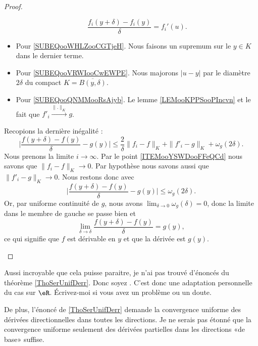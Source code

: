 \begin{proof}
\begin{subproof}
\begin{itemize}
			      \begin{equation}
				      \frac{ f_i(y+\delta)-f_i(y) }{ \delta }=f_i'(u).
			      \end{equation}
			\item Pour \ref{SUBEQooWHLZooCGTjeH}. Nous faisons un supremum sur le \( y\in K\) dans le dernier terme.
			\item Pour \ref{SUBEQooVRWIooCwEWPE}. Nous majorons \( | u-y |\) par le diamètre \( 2\delta\) du compact \( K=\overline{ B(y,\delta) }\).
			\item Pour \ref{SUBEQooQNMMooRsAjyb}. Le lemme \ref{LEMooKPPSooPIncvn} et le fait que \(   f'_i\stackrel{\| . \|_K}{\longrightarrow}g \).
		\end{itemize}

		Recopions la dernière inégalité :
		\begin{equation}
			\big| \frac{ f(y+\delta)-f(y) }{ \delta }-g(y) \big|\leq \frac{ 2 }{ \delta }\| f_i-f \|_K+\| f'_i-g \|_K+\omega_g(2\delta).
		\end{equation}
		Nous prenons la limite \( i\to \infty\). Par le point \ref{ITEMooYSWDooFFeQCd} nous savons que \( \| f_i-f \|_K\to 0\). Par hypothèse nous savons aussi que \( \| f'_i-g \|_K\to 0\). Nous restons donc avec
		\begin{equation}
			\big| \frac{ f(y+\delta)-f(y) }{ \delta }-g(y) \big|\leq \omega_g(2\delta).
		\end{equation}
		Or, par uniforme continuité de \( g\), nous avons \( \lim_{\delta\to 0}\omega_g(\delta) = 0\), donc la limite dans le membre de gauche se passe bien et
		\begin{equation}
			\lim_{\delta\to \delta}\frac{ f(y+\delta)-f(y) }{ \delta }=g(y),
		\end{equation}
		ce qui signifie que \( f\) est dérivable en \( y\) et que la dérivée est \( g(y)\).
	\end{subproof}
\end{proof}

\begin{probleme}
	Aussi incroyable que cela puisse paraitre, je n'ai pas trouvé d'énoncés du théorème \ref{ThoSerUnifDerr}. Donc soyez . C'est donc une adaptation personnelle du cas sur \( \eR\). Écrivez-moi si vous avez un problème ou un doute.
\end{probleme}

\begin{probleme}
	De plus, l'énoncé de \ref{ThoSerUnifDerr} demande la convergence uniforme des dérivées directionnelles dans toutes les directions. Je ne serais pas étonné que la convergence uniforme seulement des dérivées partielles dans les directions «de base» suffise.
\end{probleme}

